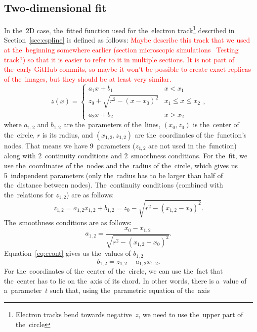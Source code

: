 		\subsection{Two-dimensional fit}
			In the~2D case, the~fitted function used for the~electron track\footnote{Electron tracks bend towards negative~$z$, we need to use the~upper part of the~circle} described in Section~\ref{sec:cspline} is defined as follows: \textcolor{red}{Maybe describe this track that we used at the~beginning somewhere earlier (section microscopic simulations \textrightarrow~Testing track?) so that it is easier to refer to it in multiple sections. It is not part of the~early GitHub commits, so maybe it won't be possible to create exact replicas of the~images, but they should be at least very similar.}
				\begin{equation}
					\label{eq:clines2d}
					z(x) = \begin{cases}
								a_1x+b_1 & x<x_1\\
								z_0+\sqrt{r^2-(x-x_0)^2} & x_1\leq x\leq x_2\\
								a_2x+b_2 & x>x_2
						   \end{cases},
				\end{equation}
			where $a_{1,2}$ and $b_{1,2}$ are the~parameters of the~lines, $(x_0,z_0)$ is the~center of the~circle, $r$ is its radius, and $(x_{1,2},z_{1,2})$ are the~coordinates of the~function's nodes. That means we have 9~parameters ($z_{1,2}$ are not used in the~function) along with 2~continuity conditions and 2~smoothness conditions. For the~fit, we use the~coordinates of the~nodes and the~radius of the~circle, which gives us 5~independent parameters (only the~radius has to be larger than half of the~distance between nodes). The~continuity conditions (combined with the~relations for $z_{1,2}$) are as follows:
				\begin{equation}
					\label{eq:ccont}
					z_{1,2} = a_{1,2}x_{1,2}+b_{1,2} = z_0-\sqrt{r^2-(x_{1,2}-x_0)^2}.
				\end{equation}
			The~smoothness conditions are as follows:
				\begin{equation}
					\label{eq:a12}
					a_{1,2} = \frac{x_0-x_{1,2}}{\sqrt{r^2-(x_{1,2}-x_0)^2}}.
				\end{equation}
			Equation~\ref{eq:ccont} gives us the~values of $b_{1,2}$
				\begin{equation}
					\label{eq:b12}
					b_{1,2} = z_{1,2} - a_{1,2} x_{1,2}.
				\end{equation}
			For the~coordinates of the~center of the~circle, we can use the~fact that the~center has to lie on the~axis of its chord. In other words, there is a~value of a~parameter~$t$ such that, using the~parametric equation of the~axis
